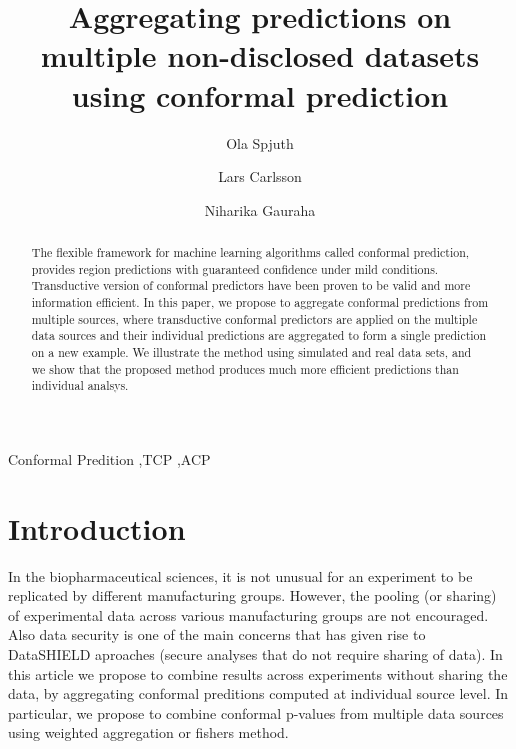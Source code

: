 \documentclass[main]{subfiles}
\begin{document}
\begin{frontmatter}

\title{Aggregating predictions on multiple non-disclosed datasets using conformal prediction}

\author[label1]{Ola Spjuth}
\author[label2]{Lars Carlsson}
\author[label1]{Niharika Gauraha}


\address[label1]{Uppsala University}
\address[label2]{AstraZeneca}

\begin{abstract}
The flexible framework for machine learning algorithms called conformal prediction, provides region predictions with guaranteed confidence under mild conditions. %
Transductive version of conformal predictors have been proven to be valid and more information efficient. In this paper, we propose to aggregate conformal predictions from multiple sources, where transductive conformal predictors are applied on the multiple data sources and their individual predictions are aggregated to form a single prediction on a new example. We illustrate the method using simulated and real data sets, and we show that the proposed method produces much more efficient predictions than individual analsys.
\end{abstract}
\begin{keyword}


Conformal Predition \sep TCP   \sep ACP
\end{keyword}

\end{frontmatter}

\section{Introduction}
In the biopharmaceutical sciences, it is not unusual for an experiment to be replicated by different manufacturing groups. However, the pooling (or sharing) of experimental data across various manufacturing groups are not encouraged. Also data security is  one of the main concerns that has given rise to DataSHIELD aproaches (secure analyses that do not require sharing of data). 
In this article we propose to combine results across experiments without sharing the data, by aggregating conformal preditions computed at individual source level.  In particular, we propose to combine conformal p-values from multiple data sources using weighted aggregation or fishers method. %
\end{document}
